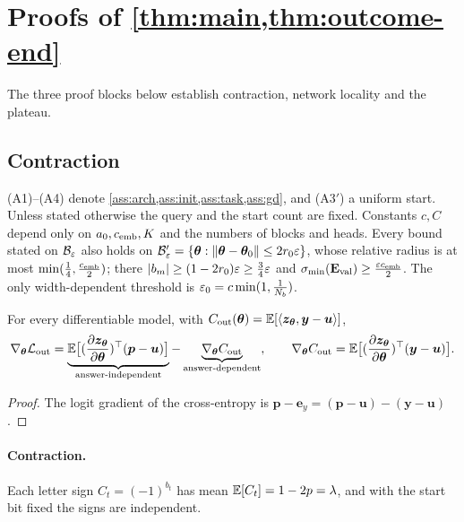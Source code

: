 \section{Proofs of \texorpdfstring{\cref{thm:main,thm:outcome-end}}{Lemma 1 and Theorem 1(ii)}}
\label{app:damping-proof}
\label{app:mainproofs}
\label{app:credit-proof}

The three proof blocks below establish contraction, network locality and the plateau.

\subsection{Contraction}
\label{app:C-fourier}
\label{app:assumptions}




(A1)--(A4) denote \cref{ass:arch,ass:init,ass:task,ass:gd}, and (A3$'$) a uniform start. Unless stated otherwise the query and the start
count are fixed. Constants $c,C$ depend only on $a_0,c_{\mathrm{emb}},K$ and the numbers of blocks and heads. Every bound stated on $\mathcal B_{\varepsilon}$ also
holds on $\mathcal B_{\varepsilon}'=\{\bm\theta:\|\bm\theta-\bm\theta_0\|\le2r_0\varepsilon\}$, whose relative radius is at most $\min(\frac{1}{4},\frac{c_{\mathrm{emb}}}{2})$; there
$|b_m|\ge(1-2r_0)\varepsilon\ge\frac{3}{4}\varepsilon$ and $\sigma_{\min}(\mathbf E_{\mathrm{val}})\ge\frac{\varepsilon c_{\mathrm{emb}}}{2}$. The only width-dependent threshold is $\varepsilon_0=c\min(1,\frac{1}{N_b})$.

\begin{lemma}
\label{lem:gradient-split}
For every differentiable model, with $C_{\mathrm{out}}(\bm\theta)=\mathbb E[\langle\bm z_{\bm\theta},\bm y-\bm u\rangle]$,
\[
 \nabla_{\bm\theta}\Lout=\underbrace{\E\bigl[(\Jz)^\top(\bm p-\bm u)\bigr]}_{\text{answer-independent}}-\underbrace{\nabla_{\bm\theta}\outcredit}_{\text{answer-dependent}},\qquad
 \nabla_{\bm\theta}\outcredit=\E\bigl[(\Jz)^\top(\bm y-\bm u)\bigr].
\]
\end{lemma}

\begin{proof}
The logit gradient of the cross-entropy is $\bm p-\bm e_y=(\bm p-\bm u)-(\bm y-\bm u)$.
\end{proof}

\paragraph{Contraction.}\label{app:contraction}\label{app:target-spectrum} Each letter sign $C_t=(-1)^{b_t}$ has mean
$\mathbb E[C_t]=1-2p=\lambda$, and with the start bit fixed the signs are independent.

